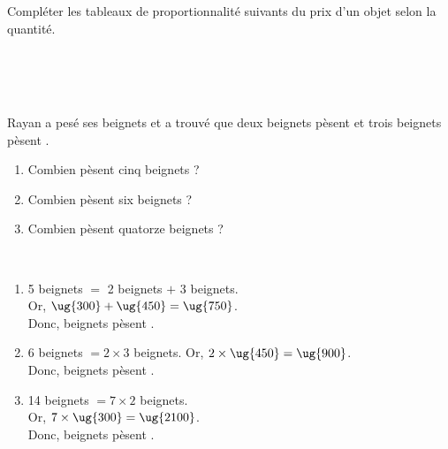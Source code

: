 \begin{colonne*exercice}
\bigskip


\begin{exercice} %
   Compléter les tableaux de proportionnalité suivants du prix d'un objet selon la quantité. \\ [-3mm]
    \\ [-8mm]
\end{exercice}

\begin{corrige}
\ \\ [-10mm]
    \\ [-10mm]
\end{corrige}

\bigskip


\begin{exercice} %
   Rayan a pesé ses beignets et a trouvé que deux beignets pèsent  et trois beignets pèsent .
   \begin{enumerate}
      \item Combien pèsent cinq beignets ?
      \item Combien pèsent six beignets ?
      \item Combien pèsent quatorze beignets ?
   \end{enumerate}
\end{exercice}

\begin{corrige}
   \ \\ [-5mm]\begin{enumerate}
      \item 5 beignets $=$ 2 beignets $+$ 3 beignets. \\
         Or, $\ug{300}+\ug{450} =\ug{750}$. \\
         Donc, { beignets pèsent }.
      \item 6 beignets $=2\times3$ beignets.
         Or, $2\times\ug{450} = \ug{900}$. \\
         Donc, { beignets pèsent }.
      \item 14 beignets $=7\times2$ beignets. \\
         Or, $7\times\ug{300} =\ug{2100}$. \\
         Donc, { beignets pèsent }.
   \end{enumerate}
\end{corrige}


\end{colonne*exercice}
